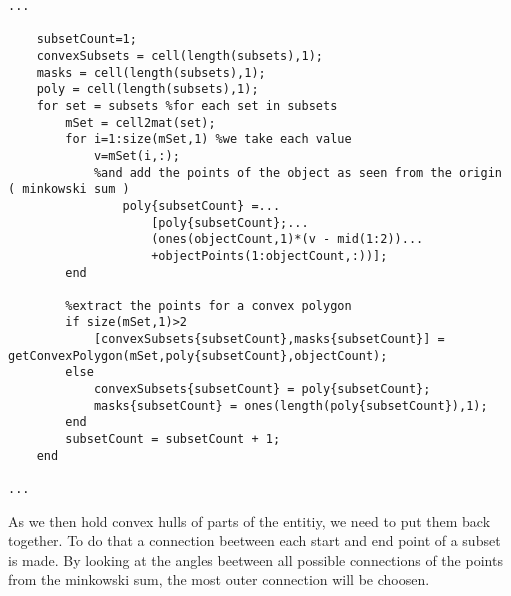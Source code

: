 \begin{lstlisting}
...

    subsetCount=1;
    convexSubsets = cell(length(subsets),1);
    masks = cell(length(subsets),1);
    poly = cell(length(subsets),1);
    for set = subsets %for each set in subsets
        mSet = cell2mat(set);
        for i=1:size(mSet,1) %we take each value
            v=mSet(i,:);
            %and add the points of the object as seen from the origin ( minkowski sum )
                poly{subsetCount} =...
                    [poly{subsetCount};...
                    (ones(objectCount,1)*(v - mid(1:2))...
                    +objectPoints(1:objectCount,:))]; 
        end

        %extract the points for a convex polygon
        if size(mSet,1)>2
            [convexSubsets{subsetCount},masks{subsetCount}] = getConvexPolygon(mSet,poly{subsetCount},objectCount);
        else
            convexSubsets{subsetCount} = poly{subsetCount};
            masks{subsetCount} = ones(length(poly{subsetCount}),1);
        end
        subsetCount = subsetCount + 1;
    end
    
...
\end{lstlisting}
 As we then hold convex hulls of parts of the entitiy, we need to put them back together. To do that a connection beetween each start and end point of a subset is made. By looking at the angles beetween all possible connections of the points from the minkowski sum, the most outer connection will be choosen.
    
